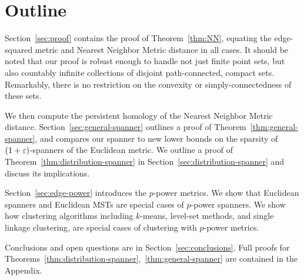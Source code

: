 \section{Outline}
%  
Section~\ref{sec:proof} contains the proof of Theorem~\ref{thm:NN},
equating the edge-squared metric and Nearest Neighbor Metric distance in
all cases. It should be noted that our proof is robust enough to handle not
just finite point sets, but also countably infinite collections of disjoint
path-connected, compact sets. Remarkably, there is no restriction on the convexity or
simply-connectedness of these sets.

We then compute the persistent homology of the Nearest Neighbor Metric
distance.  Section~\ref{sec:general-spanner} outlines a proof of
Theorem~\ref{thm:general-spanner}, and compares our spanner to new lower
bounds
on the sparsity of $(1+\varepsilon)$-spanners of the Euclidean metric.
We outline a proof of Theorem~\ref{thm:distribution-spanner} in
Section~\ref{sec:distribution-spanner} and discuss its implications.  

Section~\ref{sec:edge-power} introduces the $p$-power metrics. We show
that Euclidean spanners and Euclidean MSTs are special cases of
$p$-power spanners. We show how
clustering algorithms including $k$-means, level-set methods,
and single linkage clustering, are special cases of
clustering with $p$-power metrics.


Conclusions and open questions are in
Section~\ref{sec:conclusions}. Full proofs for
Theorems~\ref{thm:distribution-spanner},~\ref{thm:general-spanner}
are contained in the Appendix.
